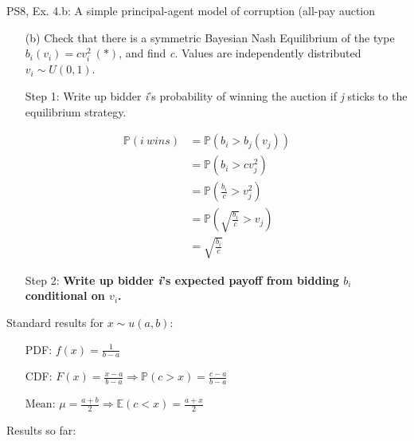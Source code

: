 \begin{frame}{PS8, Ex. 4.b: A simple principal-agent model of corruption (all-pay auction}
    \begin{itemize}
      \item[(b)] Check that there is a symmetric Bayesian Nash Equilibrium of the type $b_i(v_i) = cv_i^2\ (*)$, and find \textit{c}. Values are independently distributed $v_i\sim U(0, 1)$.
    \end{itemize} \vspace{-8pt}
    \begin{multicols}{2}
      \begin{itemize}
        \item[Step 1:] Write up bidder \textit{i}'s probability of winning the auction if \textit{j} sticks to the equilibrium strategy.
      \end{itemize} \vspace{-8pt}
      \begin{align*}
        \mathbb{P}(i\ wins)&=\mathbb{P}(b_i>b_j(v_j))\\
                           &=\mathbb{P}(b_i>cv_j^2)\\
                           &=\mathbb{P}\left(\frac{b_i}{c}>v_j^2\right)\\
                           &=\mathbb{P}\left(\sqrt{\frac{b_i}{c}}>v_j\right)\\
                           &=\sqrt{\frac{b_i}{c}}
      \end{align*} \vspace{-8pt}
      \begin{itemize}
        \item[Step 2:] \textbf{Write up bidder \textit{i}'s expected payoff from bidding $b_i$ conditional on $v_i$.}
      \end{itemize}
      \vfill\null\columnbreak
      Standard results for $x\sim u(a, b):$ \vspace{-6pt}
      \begin{itemize}
        \item[PDF:] $f(x)=\frac{1}{b-a}$
        \item[CDF:] $F(x)=\frac{x-a}{b-a}\Rightarrow\mathbb{P}(c>x)=\frac{c-a}{b-a}$
        \item[Mean:] $\mu=\frac{a+b}{2}\Rightarrow\mathbb{E}(c<x)=\frac{a+x}{2}$
      \end{itemize}
      \vspace{-6pt}
      Results so far: \vspace{-6pt}
      \begin{align*}

\end{align*}
\end{multicols}
\end{frame}
